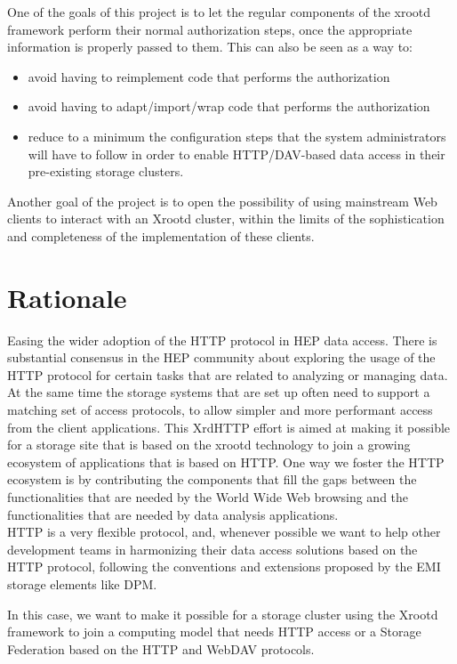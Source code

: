 \documentclass[12pt]{article} %
\begin{document}
 One of the goals of this project is to let the regular components of the xrootd framework perform their normal authorization steps, once the appropriate information is properly passed to them. This can also be seen as a way to:

\begin{itemize}
 \item avoid having to reimplement code that performs the authorization
 \item avoid having to adapt/import/wrap code that performs the authorization
 \item reduce to a minimum the configuration steps that the system administrators will have to follow in order to enable HTTP/DAV-based data access in their pre-existing storage clusters.
\end{itemize}

 Another goal of the project is to open the possibility of using mainstream Web clients to interact with an Xrootd cluster, within the limits of the sophistication and completeness of the implementation of these clients.

\section{Rationale}

Easing the wider adoption of the HTTP protocol in HEP data access. There is substantial consensus in the HEP community about exploring the usage of the HTTP protocol for certain tasks that are related to analyzing or managing data.\\
At the same time the storage systems that are set up often need to support a matching set of access protocols, to allow simpler and more performant access from the client applications. This XrdHTTP effort is aimed at making it possible for a storage site that is based on the xrootd technology to join a growing ecosystem of applications that is based on HTTP. One way we foster the HTTP ecosystem is by contributing the components that fill the gaps between the functionalities that are needed by the World Wide Web browsing and the functionalities that are needed by data analysis applications.\\
HTTP is a very flexible protocol, and, whenever possible we want to help other development teams in harmonizing their data access solutions based on the HTTP protocol, following the conventions and extensions proposed by the EMI storage elements like DPM.

In this case, we want to make it possible for a storage cluster using the Xrootd framework to join a computing model that needs HTTP access or a Storage Federation based on the HTTP and WebDAV protocols.
\end{document}
